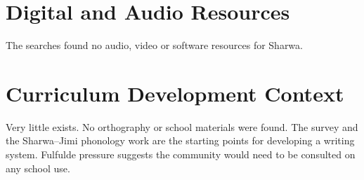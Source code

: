 \documentclass[12pt]{article}
\begin{document}
\section{Digital and Audio Resources}
The searches found no audio, video or software resources for Sharwa.

\section{Curriculum Development Context}
Very little exists. No orthography or school materials were found. The survey and the Sharwa--Jimi phonology work are the starting points for developing a writing system. Fulfulde pressure suggests the community would need to be consulted on any school use.
\end{document}
